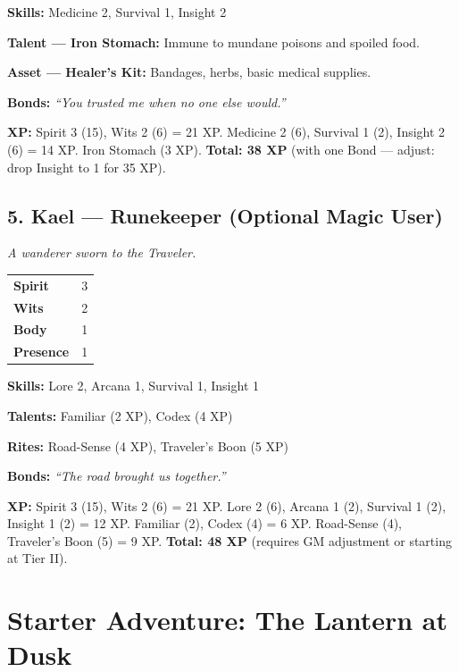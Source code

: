 \documentclass[11pt]{book}
\begin{document}
\textbf{Skills:} Medicine 2, Survival 1, Insight 2

\textbf{Talent --- Iron Stomach:} Immune to mundane poisons and spoiled food.

\textbf{Asset --- Healer's Kit:} Bandages, herbs, basic medical supplies.

\textbf{Bonds:} \textit{``You trusted me when no one else would.''}

\textbf{XP:} Spirit 3 (15), Wits 2 (6) = 21 XP. Medicine 2 (6), Survival 1 (2), Insight 2 (6) = 14 XP. Iron Stomach (3 XP). \textbf{Total: 38 XP} (with one Bond --- adjust: drop Insight to 1 for 35 XP).

\section*{5. Kael --- Runekeeper (Optional Magic User)}

\textit{A wanderer sworn to the Traveler.}

\begin{tabular}{ll}
\textbf{Spirit} & 3 \\
\textbf{Wits} & 2 \\
\textbf{Body} & 1 \\
\textbf{Presence} & 1 \\
\end{tabular}

\textbf{Skills:} Lore 2, Arcana 1, Survival 1, Insight 1

\textbf{Talents:} Familiar (2 XP), Codex (4 XP)

\textbf{Rites:} Road-Sense (4 XP), Traveler's Boon (5 XP)

\textbf{Bonds:} \textit{``The road brought us together.''}

\textbf{XP:} Spirit 3 (15), Wits 2 (6) = 21 XP. Lore 2 (6), Arcana 1 (2), Survival 1 (2), Insight 1 (2) = 12 XP. Familiar (2), Codex (4) = 6 XP. Road-Sense (4), Traveler's Boon (5) = 9 XP. \textbf{Total: 48 XP} (requires GM adjustment or starting at Tier II).

\clearpage


\chapter{Starter Adventure: The Lantern at Dusk}
\label{ch:lantern-at-dusk}
\end{document}
